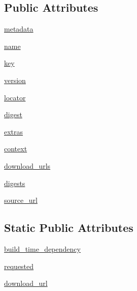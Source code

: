 \subsection*{Public Attributes}
\begin{DoxyCompactItemize}
\item 
\hyperlink{classpip_1_1__vendor_1_1distlib_1_1database_1_1Distribution_adda9f0db4ba50d2a3b8dd421e576fb79}{metadata}
\item 
\hyperlink{classpip_1_1__vendor_1_1distlib_1_1database_1_1Distribution_acfca325d3befe932ba349f233535c956}{name}
\item 
\hyperlink{classpip_1_1__vendor_1_1distlib_1_1database_1_1Distribution_ae942e497260a26f3f0359b15d224b45c}{key}
\item 
\hyperlink{classpip_1_1__vendor_1_1distlib_1_1database_1_1Distribution_a5f47d3bbdb5255c6482adfee03ea4298}{version}
\item 
\hyperlink{classpip_1_1__vendor_1_1distlib_1_1database_1_1Distribution_a6b5ddeace461ee4237b7d995313bc862}{locator}
\item 
\hyperlink{classpip_1_1__vendor_1_1distlib_1_1database_1_1Distribution_a1af2aef3ef4f1d63c0d73999ae304318}{digest}
\item 
\hyperlink{classpip_1_1__vendor_1_1distlib_1_1database_1_1Distribution_ac8cd28a19f5600ff863872e0829ab22e}{extras}
\item 
\hyperlink{classpip_1_1__vendor_1_1distlib_1_1database_1_1Distribution_a1487f94c0294310cfd9154774bb21e17}{context}
\item 
\hyperlink{classpip_1_1__vendor_1_1distlib_1_1database_1_1Distribution_ab6d291421bb1008b677dd0f59a1f7c60}{download\+\_\+urls}
\item 
\hyperlink{classpip_1_1__vendor_1_1distlib_1_1database_1_1Distribution_af154042d525bcd835b7ab74298b054b1}{digests}
\item 
\hyperlink{classpip_1_1__vendor_1_1distlib_1_1database_1_1Distribution_adfdc09da09e22e9c69e6f75da44b0530}{source\+\_\+url}
\end{DoxyCompactItemize}
\subsection*{Static Public Attributes}
\begin{DoxyCompactItemize}
\item 
\hyperlink{classpip_1_1__vendor_1_1distlib_1_1database_1_1Distribution_a38fc42337ea488191bc75cab64801586}{build\+\_\+time\+\_\+dependency}
\item 
\hyperlink{classpip_1_1__vendor_1_1distlib_1_1database_1_1Distribution_a1c8aefd67a09b773f63eb16675c10e25}{requested}
\item 
\hyperlink{classpip_1_1__vendor_1_1distlib_1_1database_1_1Distribution_ad9b7e75076d1095f95cbdd40069c70af}{download\+\_\+url}
\end{DoxyCompactItemize}


